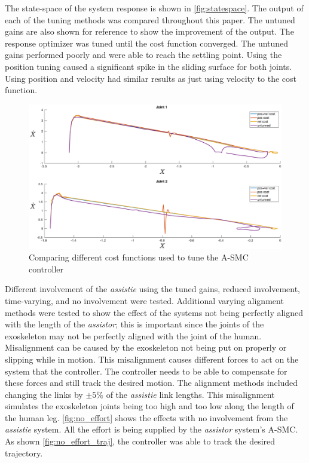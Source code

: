 The state-space of the system response is shown in  \autoref{fig:statespace}. The output of each of the tuning methods was compared throughout this paper. The untuned gains are also shown for reference to show the improvement of the output. The response optimizer was tuned until the cost function converged. The untuned gains performed poorly and were able to reach the settling point. Using the position tuning caused a significant spike in the sliding surface for both joints. Using position and velocity had similar results as just using velocity to the cost function. 


\begin{figure}[ht!]
    \centering
    \includegraphics[width=\linewidth]{images/controllers/statespace.eps}
    \caption[A-SMC State Space]{Comparing different cost functions used to tune the A-SMC controller}
    \label{fig:statespace}
\end{figure}

Different involvement of the \textit{assistie}  using the tuned gains, reduced involvement, time-varying, and no involvement were tested. Additional varying alignment methods were tested to show the effect of the systems not being perfectly aligned with the length of the \textit{assistor}; this is important since the joints of the exoskeleton may not be perfectly aligned with the joint of the human. Misalignment can be caused by the exoskeleton not being put on properly or slipping while in motion. This misalignment causes different forces to act on the system that the controller. The controller needs to be able to compensate for these forces and still track the desired motion. The alignment methods included changing the links by $\pm 5\%$ of the \textit{assistie} link lengths. This misalignment simulates the exoskeleton joints being too high and too low along the length of the human leg. \autoref{fig:no_effort} shows the effects with no involvement from the \textit{assistie} system. All the effort is being supplied by the \textit{assistor} system's A-SMC. As shown \autoref{fig:no_effort_traj}, the controller was able to track the desired trajectory. 

